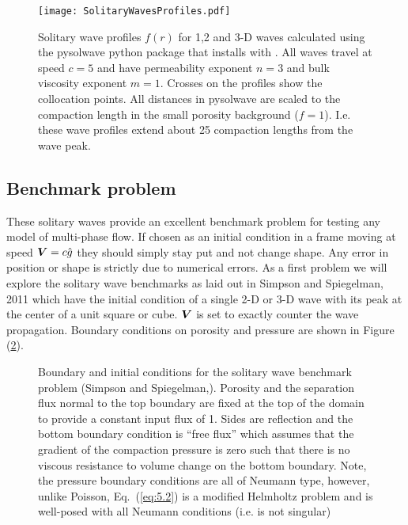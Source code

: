 \begin{figure}[htbp!]
  \centering
  \texttt{[image: SolitaryWavesProfiles.pdf]}
  \caption{Solitary wave profiles $f(r)$ for 1,2 and 3-D waves
    calculated using the pysolwave python package that installs with
    \TF.  All waves travel at speed $c=5$ and have permeability
    exponent $n=3$ and bulk viscosity exponent $m=1$.  Crosses on the
    profiles show the collocation points. All distances in pysolwave
    are scaled to the compaction length in the small porosity
    background ($f=1$).  I.e. these wave profiles extend about 25
    compaction lengths from the wave peak.}
\label{fig:SolitaryWaveProfiles}
 \end{figure}

\subsection{Benchmark problem}
\label{sec:benchmark-problem}

These solitary waves provide an excellent benchmark problem for
testing any model of multi-phase flow.  If chosen as an initial
condition in a frame moving at speed ${\mbox{\boldmath$V$}} = c\hat{g}$ they should
simply stay put and not change shape.  Any error in position or shape
is strictly due to numerical errors.  As a first problem we will
explore the solitary wave benchmarks as laid out in Simpson and
Spiegelman, 2011 \cite{simpson_solitary_2011} which have the initial
condition of  a single 2-D
or 3-D wave with its peak at the center of a unit square or cube.
${\mbox{\boldmath$V$}}$ is set to exactly counter the wave propagation.  Boundary
conditions on porosity and pressure are shown in Figure (\ref{fig:solitarywavebcs}). 

\begin{figure}[htbp!]
  \centering
  \def\svgwidth{.8\textwidth}
  
  \caption{Boundary and initial conditions for the solitary wave
    benchmark problem (Simpson and
    Spiegelman,\cite{simpson_solitary_2011}). Porosity and the
    separation flux normal to the top boundary are fixed at the top of
    the domain to provide  a constant input flux of 1.
  Sides are reflection and the bottom boundary condition is ``free
  flux'' which assumes that the gradient of the compaction pressure is
zero such that there is no viscous resistance to volume change on the
bottom boundary. Note, the pressure boundary conditions are all of
Neumann type,  however, unlike Poisson,  Eq.\ (\ref{eq:5.2}) is a
modified Helmholtz problem and is well-posed with all Neumann
conditions (i.e. is not singular)}
  \label{fig:solitarywavebcs}
\end{figure}


